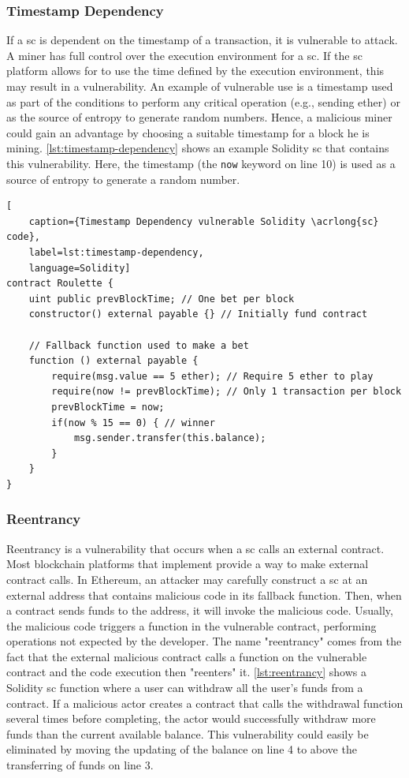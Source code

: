 \subsubsection{Timestamp Dependency}
If a \acrlong{sc} is dependent on the timestamp of a transaction, it is vulnerable to attack. A miner has full control over the execution environment for a \acrshort{sc}. If the \acrshort{sc} platform allows for  to use the time defined by the execution environment, this may result in a vulnerability. An example of vulnerable use is a timestamp used as part of the conditions to perform any critical operation (e.g., sending ether) or as the source of entropy to generate random numbers. Hence, a malicious miner could gain an advantage by choosing a suitable timestamp for a block he is mining. \cref{lst:timestamp-dependency} shows an example Solidity \acrshort{sc} that contains this vulnerability. Here, the timestamp (the \lstinline[language=Solidity]!now! keyword on line 10) is used as a source of entropy to generate a random number.

\begin{lstlisting}[
    caption={Timestamp Dependency vulnerable Solidity \acrlong{sc} code},
    label=lst:timestamp-dependency,
    language=Solidity]
contract Roulette {
    uint public prevBlockTime; // One bet per block
    constructor() external payable {} // Initially fund contract
    
    // Fallback function used to make a bet
    function () external payable {
        require(msg.value == 5 ether); // Require 5 ether to play
        require(now != prevBlockTime); // Only 1 transaction per block
        prevBlockTime = now;
        if(now % 15 == 0) { // winner
            msg.sender.transfer(this.balance);
        }
    }
}
\end{lstlisting}

\subsubsection{Reentrancy}
Reentrancy is a vulnerability that occurs when a \acrshort{sc} calls an external contract. Most blockchain platforms that implement  provide a way to make external contract calls. In Ethereum, an attacker may carefully construct a \acrshort{sc} at an external address that contains malicious code in its fallback function. Then, when a contract sends funds to the address, it will invoke the malicious code. Usually, the malicious code triggers a function in the vulnerable contract, performing operations not expected by the developer. The name "reentrancy" comes from the fact that the external malicious contract calls a function on the vulnerable contract and the code execution then "reenters" it. \cref{lst:reentrancy} shows a Solidity \acrshort{sc} function where a user can withdraw all the user's funds from a contract. If a malicious actor creates a contract that calls the withdrawal function several times before completing, the actor would successfully withdraw more funds than the current available balance. This vulnerability could easily be eliminated by moving the updating of the balance on line 4 to above the transferring of funds on line 3.

